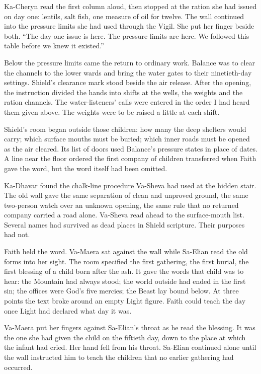 Ka-Cheryn read the first column aloud, then stopped at the ration she had issued on day one: lentils, salt fish, one measure of oil for twelve. The wall continued into the pressure limits she had used through the Vigil. She put her finger beside both. ``The day-one issue is here. The pressure limits are here. We followed this table before we knew it existed.''\par

Below the pressure limits came the return to ordinary work. Balance was to clear the channels to the lower wards and bring the water gates to their ninetieth-day settings. Shield's clearance mark stood beside the air release. After the opening, the instruction divided the hands into shifts at the wells, the weights and the ration channels. The water-listeners' calls were entered in the order I had heard them given above. The weights were to be raised a little at each shift.\par

Shield's room began outside those children: how many the deep shelters would carry; which surface mouths must be buried; which inner roads must be opened as the air cleared. Its list of doors used Balance's pressure states in place of dates. A line near the floor ordered the first company of children transferred when Faith gave the word, but the word itself had been omitted.\par

Ka-Dhavar found the chalk-line procedure Va-Sheva had used at the hidden stair. The old wall gave the same separation of clean and unproved ground, the same two-person watch over an unknown opening, the same rule that no returned company carried a road alone. Va-Sheva read ahead to the surface-mouth list. Several names had survived as dead places in Shield scripture. Their purposes had not.\par

Faith held the word. Va-Maera sat against the wall while Sa-Elian read the old forms into her sight. The room specified the first gathering, the first burial, the first blessing of a child born after the ash. It gave the words that child was to hear: the Mountain had always stood; the world outside had ended in the first sin; the offices were God's five mercies; the Beast lay bound below. At three points the text broke around an empty Light figure. Faith could teach the day once Light had declared what day it was.\par

Va-Maera put her fingers against Sa-Elian's throat as he read the blessing. It was the one she had given the child on the fiftieth day, down to the place at which the infant had cried. Her hand fell from his throat. Sa-Elian continued alone until the wall instructed him to teach the children that no earlier gathering had occurred.\par

